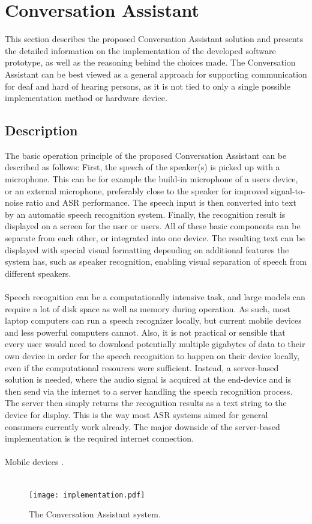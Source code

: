 \documentclass[english, 12pt, a4paper, pdftex, elec, utf8]{aaltothesis}
\begin{document}
\clearpage

\section{Conversation Assistant} \label{sec:implementation}

This section describes the proposed Conversation Assistant solution and presents the detailed information on the implementation of the developed software prototype, as well as the reasoning behind the choices made. The Conversation Assistant can be best viewed as a general approach for supporting communication for deaf and hard of hearing persons, as it is not tied to only a single possible implementation method or hardware device.  

\subsection{Description}

The basic operation principle of the proposed Conversation Assistant can be described as follows: First, the speech of the speaker(s) is picked up with a microphone. This can be for example the build-in microphone of a users device, or an external microphone, preferably close to the speaker for improved signal-to-noise ratio and ASR performance. The speech input is then converted into text by an automatic speech recognition system. Finally, the recognition result is displayed on a screen for the user or users. All of these basic components can be separate from each other, or integrated into one device. The resulting text can be displayed with special visual formatting depending on additional features the system has, such as speaker recognition, enabling visual separation of speech from different speakers. \\\\
Speech recognition can be a computationally intensive task, and large models can require a lot of disk space as well as memory during operation. As such, most laptop computers can run a speech recognizer locally, but current mobile devices and less powerful computers cannot. Also, it is not practical or sensible that every user would need to download potentially multiple gigabytes of data to their own device in order for the speech recognition to happen on their device locally, even if the computational resources were sufficient. Instead, a server-based solution is needed, where the audio signal is acquired at the end-device and is then send via the internet to a server handling the speech recognition process. The server then simply returns the recognition results as a text string to the device for display. This is the way most ASR systems aimed for general consumers currently work already. The major downside of the server-based implementation is the required internet connection. \\\\
Mobile devices \cite{mcgraw2016personalized}. \\\\
\begin{figure}[h]
	\centering
	\texttt{[image: implementation.pdf]}
	\caption{The Conversation Assistant system.}
	\label{fig:system} 
\end{figure}
\end{document}
